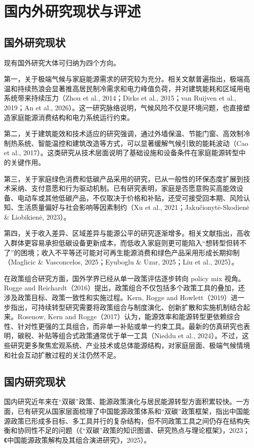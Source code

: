 \documentclass[12pt,a4paper]{ctexart}
\begin{document}
\section{国内外研究现状与评述}
\subsection{国外研究现状}
现有国外研究大体可归纳为四个方向。

第一，关于极端气候与家庭能源需求的研究较为充分。相关文献普遍指出，极端高温和持续热浪会显著推高居民制冷需求和电力峰值负荷，并对建筑能耗和区域用电系统带来持续压力（Zhou et al., 2014；Dirks et al., 2015；van Ruijven et al., 2019；An et al., 2026）。这一研究脉络说明，气候风险不仅是环境问题，也直接塑造家庭能源消费结构和电力系统运行约束。

第二，关于建筑能效和技术适应的研究强调，通过外墙保温、节能门窗、高效制冷制热系统、智能温控和建筑改造等方式，可以显著缓解气候引致的能耗波动（Cao et al., 2017）。这类研究从技术层面说明了基础设施和设备条件在家庭能源转型中的关键作用。

第三，关于家庭绿色消费和低碳产品采用的研究，已从一般性的环保态度扩展到技术采纳、支付意愿和行为驱动机制。已有研究表明，家庭是否愿意购买高能效设备、电动车或其他低碳产品，不仅取决于价格和补贴，还受可接受回本期、风险认知、生活质量偏好与社会影响等因素制约（Xu et al., 2021；Jakučionytė-Skodienė \& Liobikienė, 2023）。

第四，关于收入差异、区域差异与能源公平的研究逐渐增多。相关文献指出，高收入群体更容易承担低碳设备更新成本，而低收入家庭则更可能陷入“想转型但转不了”的困境；收入不平等还可能对可再生能源消费和绿色产品采用形成长期抑制（Maglicic \& Vasconcelos, 2025；Eyuboglu \& Uzar, 2025；Liu et al., 2025）。

在政策组合研究方面，国外学界已经从单一政策评估逐步转向 policy mix 视角。Rogge and Reichardt（2016）提出，政策组合不仅包括多个政策工具的叠加，还涉及政策目标、政策一致性和实施过程。Kern, Rogge and Howlett（2019）进一步指出，可持续转型研究需要将政策组合与制度演化、创新扩散和实施机制结合起来。Rosenow, Kern and Rogge（2017）认为，能源效率和能源转型更依赖综合性、针对性更强的工具组合，而非单一补贴或单一约束工具。最新的仿真研究也表明，碳税、补贴等组合式政策通常优于单一工具（Nieddu et al., 2024）。不过，这些研究更多聚焦宏观系统、产业技术或总体能源结构，对家庭层面、极端气候情境和社会互动扩散过程的关注仍然不足。

\subsection{国内研究现状}
国内研究近年来在“双碳”政策、能源政策演化与居民能源转型方面积累较快。一方面，已有研究从国家层面梳理了中国能源政策体系和“双碳”政策框架，指出中国能源政策已形成多目标、多工具并行的复杂结构，但不同政策工具之间仍存在结构失衡和协同性不足的问题（《“双碳”政策的知识图谱、研究热点与理论框架》，2023；《中国能源政策解构及其组合演进研究》，2025）。
\end{document}
